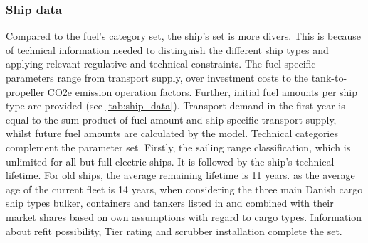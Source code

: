 \documentclass[article]{elsarticle}
\begin{document}
\subsubsection{Ship data}
Compared to the fuel's category set, the ship's set is more divers. This is because of technical information needed to distinguish the different ship types and applying relevant regulative and technical constraints. The fuel specific parameters range from transport supply, over investment costs to the tank-to-propeller CO2e emission operation factors. Further, initial fuel amounts per ship type are provided (see \cref{tab:ship_data}). Transport demand in the first year is equal to the sum-product of fuel amount and ship specific transport supply, whilst future fuel amounts are calculated by the model. Technical categories complement the parameter set. Firstly, the sailing range classification, which is unlimited for all but full electric ships. It is followed by the ship's technical lifetime. For old ships, the average remaining lifetime is 11 years. as the average age of the current fleet is 14 years, when considering the three main Danish cargo ship types bulker, containers and tankers listed in \cite[Tab.~2.2, p.~27]{UNCTAD2017} and combined with their market shares based on own assumptions with regard to cargo types. Information about refit possibility, Tier rating and scrubber installation complete the set.
\end{document}
